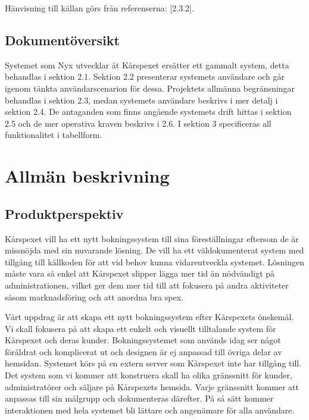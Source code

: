 \documentclass[a4paper, twoside, 11pt, titlepage]{article}
\begin{document}
		Hänvisning till källan görs från referenserna: [2.3.2].

	\subsection{Dokumentöversikt}


	Systemet som Nyx utvecklar åt Kårspexet ersätter ett gammalt system, detta behandlas i sektion 2.1. Sektion 2.2 presenterar systemets användare och går igenom tänkta användarscenarion för dessa. Projektets allmänna begränsningar behandlas i sektion 2.3, medan systemets användare beskrivs i mer detalj i sektion 2.4. De antaganden som finns angående systemets drift hittas i sektion 2.5 och de mer operativa kraven beskrivs i 2.6. I sektion 3 specificeras all funktionalitet i tabellform.

\clearpage
\section{Allmän beskrivning}



	\subsection{Produktperspektiv}


	Kårspexet vill ha ett nytt bokningssystem till sina föreställningar eftersom de är missnöjda med sin nuvarande lösning. De vill ha ett väldokumenterat system med tillgång till källkoden för att vid behov kunna vidareutveckla systemet. Lösningen måste vara så enkel att Kårspexet slipper lägga mer tid än nödvändigt på administrationen, vilket ger dem mer tid till att fokusera på andra aktiviteter såsom marknadsföring och att anordna bra spex.

	Vårt uppdrag är att skapa ett nytt bokningssystem efter Kårspexets önskemål. Vi skall fokusera på att skapa ett enkelt och visuellt tilltalande system för Kårspexet och deras kunder. Bokningssystemet som används idag ser något föråldrat och komplicerat ut och designen är ej anpassad till övriga delar av hemsidan. Systemet körs på en extern server som Kårspexet inte har tillgång till. Det system som vi kommer att konstruera skall ha olika gränssnitt för kunder, administratörer och säljare på Kårspexets hemsida. Varje gränssnitt kommer att anpassas till sin målgrupp och dokumenteras därefter. På så sätt kommer interaktionen med hela systemet bli lättare och angenämare för alla användare.
\end{document}
